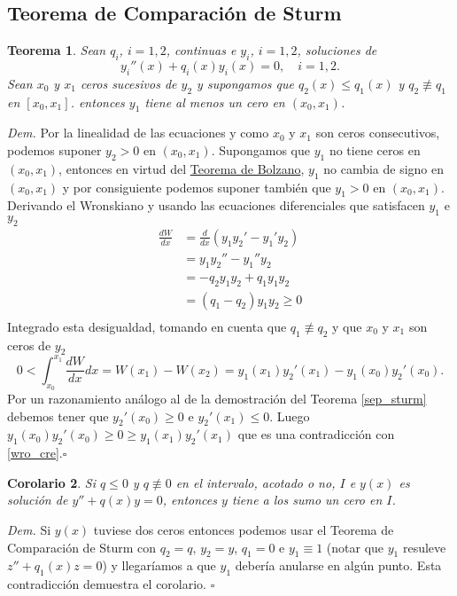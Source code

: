 \documentclass{article}
\newenvironment{demo}{\noindent\emph{Dem.}}{{\hspace*{\fill}$\square$} \newline\vspace{5pt}}
\newtheorem{teorema}{Teorema}[section]
\newtheorem{corolario}[teorema]{Corolario}
\begin{document}
\subsection{Teorema de Comparación de Sturm}

\begin{teorema} Sean $q_i$, $i=1,2$,  continuas e  $y_i$, $i=1,2$, soluciones de
\[ y_i''(x)+q_i(x)y_i(x)=0,\quad i=1,2.\]
Sean $x_0$ y $x_1$ ceros sucesivos de $y_2$ y supongamos que $q_2(x)\leq q_1(x)$ y $q_2\not\equiv q_1$ en $[x_0,x_1]$. entonces $y_1$ tiene al menos un cero en $(x_0,x_1)$. 
\end{teorema}
\begin{demo} Por la linealidad de las ecuaciones y como $x_0$ y $x_1$ son ceros consecutivos, podemos suponer $y_2>0$ en $(x_0,x_1)$. Supongamos que $y_1$ no tiene ceros en $(x_0,x_1)$, entonces en virtud del \href{http://es.wikipedia.org/wiki/Teorema_del_valor_intermedio}{Teorema de Bolzano}, $y_1$ no cambia de signo en $(x_0,x_1)$ y por consiguiente podemos suponer también que $y_1>0$ en $(x_0,x_1)$. Derivando el Wronskiano y usando las ecuaciones diferenciales que satisfacen $y_1$ e $y_2$ 
\[\begin{split}
\frac{dW}{dx} &= \frac{d}{dx} (y_1y_2'-y_1'y_2)\\
&=y_1y_2''-y_1''y_2\\
&=-q_2y_1y_2+q_1y_1y_2\\
&=(q_1-q_2)y_1y_2\geq 0\\
\end{split}
\]
Integrado esta desigualdad, tomando en cuenta que $q_1\not\equiv q_2$ y que $x_0$ y $x_1$ son ceros de $y_2$
\begin{equation}\label{wro_cre}0<\int_{x_0}^{x_1}\frac{dW}{dx}dx=W(x_1)-W(x_2)=y_1(x_1)y_2'(x_1)-y_1(x_0)y_2'(x_0).
\end{equation}
Por un razonamiento análogo al de la demostración del Teorema \ref{sep_sturm} debemos tener que $y_2'(x_0)\geq 0$ e $y_2'(x_1)\leq 0$. Luego $y_1(x_0)y_2'(x_0)\geq 0\geq y_1(x_1)y_2'(x_1)$ que es una contradicción con \eqref{wro_cre}.\end{demo}


\begin{corolario} Si $q\leq 0$ y $q\not\equiv 0$ en el intervalo, acotado o no, $I$ e  $y(x)$ es solución de $y''+q(x)y=0$, entonces $y$ tiene a los sumo un cero en $I$.
\end{corolario}
\begin{demo} Si $y(x)$ tuviese dos ceros entonces podemos usar el Teorema de Comparación de Sturm con $q_2=q$, $y_2=y$, $q_1=0$ e $y_1\equiv 1$ (notar que $y_1$ resuleve $z''+q_1(x)z=0$) y llegaríamos a que $y_1$ debería anularse en algún punto. Esta contradicción demuestra el corolario.  
\end{demo}
\end{document}
